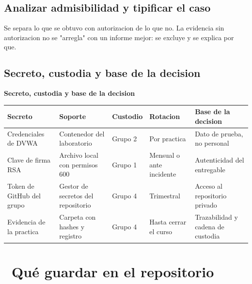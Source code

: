 \documentclass[11pt,a4paper]{article}
\newcommand{\iconotexto}[2]{\textcolor{cyanNeon}{\faIcon{#1}}~#2}
\begin{document}
\subsection{Analizar admisibilidad y tipificar el caso}

Se separa lo que se obtuvo con autorizacion de lo que no. La evidencia sin autorizacion no se "arregla" con un informe mejor: se excluye y se explica por que.

\subsection{Secreto, custodia y base de la decision}

\begin{center}
\begin{minipage}{\linewidth}
\centering
{\footnotesize
\textbf{Secreto, custodia y base de la decision}\par\smallskip
\begin{tabular}{@{}>{\raggedright\arraybackslash}p{2.80cm}>{\raggedright\arraybackslash}p{2.60cm}>{\raggedright\arraybackslash}p{2.40cm}>{\raggedright\arraybackslash}p{2.20cm}>{\raggedright\arraybackslash}p{4.20cm}@{}}
\toprule
\textbf{Secreto} & \textbf{Soporte} & \textbf{Custodio} & \textbf{Rotacion} & \textbf{Base de la decision} \\
\midrule
Credenciales de DVWA & Contenedor del laboratorio & Grupo 2 & Por practica & Dato de prueba, no personal \\
Clave de firma RSA & Archivo local con permisos 600 & Grupo 1 & Mensual o ante incidente & Autenticidad del entregable \\
Token de GitHub del grupo & Gestor de secretos del repositorio & Grupo 4 & Trimestral & Acceso al repositorio privado \\
Evidencia de la practica & Carpeta con hashes y registro & Grupo 4 & Hasta cerrar el curso & Trazabilidad y cadena de custodia \\
\bottomrule
\end{tabular}
}
\par{}
\end{minipage}
\end{center}

\section{\iconotexto{box-open}{Qué guardar en el repositorio}}
\end{document}

